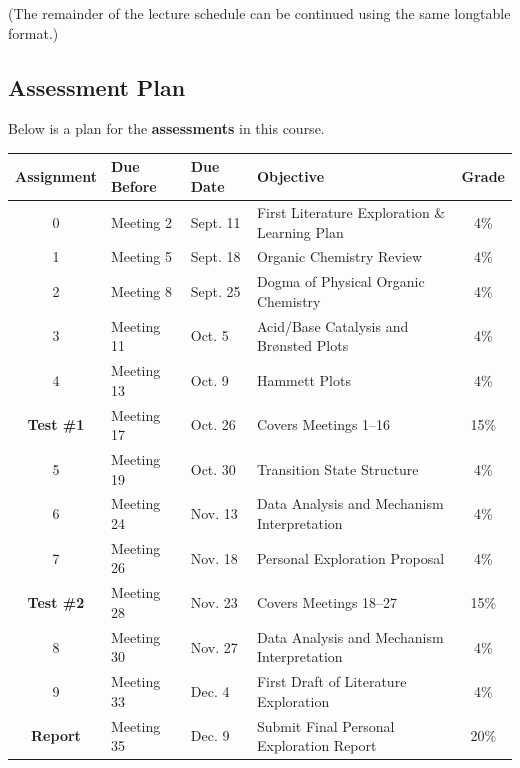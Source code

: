 (The remainder of the lecture schedule can be continued using the same longtable format.)

\subsection{Assessment Plan}

Below is a plan for the \textbf{assessments} in this course.

\begin{longtable}{cp{2cm}p{2cm}p{7cm}c}
\toprule
Assignment & Due Before & Due Date & Objective & Grade \\
\midrule
0 & Meeting 2 & Sept. 11 & First Literature Exploration \& Learning Plan & 4\% \\
1 & Meeting 5 & Sept. 18 & Organic Chemistry Review & 4\% \\
2 & Meeting 8 & Sept. 25 & Dogma of Physical Organic Chemistry & 4\% \\
3 & Meeting 11 & Oct. 5 & Acid/Base Catalysis and Brønsted Plots & 4\% \\
4 & Meeting 13 & Oct. 9 & Hammett Plots & 4\% \\
\textbf{Test \#1} & Meeting 17 & Oct. 26 & Covers Meetings 1--16 & 15\% \\
5 & Meeting 19 & Oct. 30 & Transition State Structure & 4\% \\
6 & Meeting 24 & Nov. 13 & Data Analysis and Mechanism Interpretation & 4\% \\
7 & Meeting 26 & Nov. 18 & Personal Exploration Proposal & 4\% \\
\textbf{Test \#2} & Meeting 28 & Nov. 23 & Covers Meetings 18--27 & 15\% \\
8 & Meeting 30 & Nov. 27 & Data Analysis and Mechanism Interpretation & 4\% \\
9 & Meeting 33 & Dec. 4 & First Draft of Literature Exploration & 4\% \\
\textbf{Report} & Meeting 35 & Dec. 9 & Submit Final Personal Exploration Report & 20\% \\
\bottomrule
\end{longtable}


